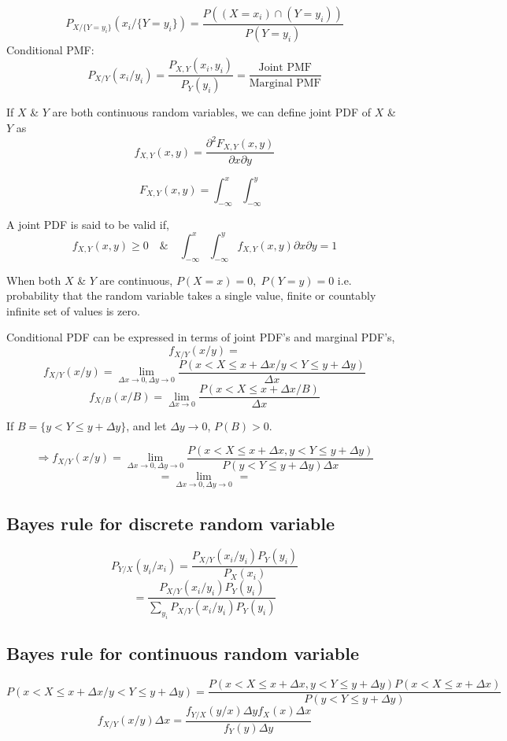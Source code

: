 \documentclass{article}
\begin{document}
$$ P_{X/\{ Y = y_i \}}(x_i/\{ Y = y_i \})= \frac{P((X= x_i) \cap (Y=y_i))}{P(Y=y_i)}$$
Conditional PMF:
$$ P_{X/Y} (x_i /y_i)= \frac{P_{X,Y}(x_i,y_i)}{P_Y(y_i)}= \frac{\text{Joint PMF}}{\text{Marginal PMF}}$$



If $X$ \& $Y$ are both continuous random variables, we can define joint PDF of $X$ \& $Y$ as
$$ f_{X,Y}(x,y)= \frac{\partial^2 F_{X,Y}(x,y)}{\partial x \partial y}$$

$$ F_{X,Y}(x,y) =\int_{-\infty}^{x} \int_{-\infty}^{y} $$

A joint PDF is said to be valid if,
$$ f_{X,Y}(x,y) \geq 0 \quad \& \quad \int_{-\infty}^{x} \int_{-\infty}^{y} f_{X,Y}(x,y)\partial x \partial y =1$$

When both $X$ \& $Y$ are continuous,
$P(X=x )=0,\; P(Y=y)=0 $ i.e. probability that the random variable takes a single value, finite or countably infinite set of values is zero.

Conditional PDF can be expressed in terms of joint PDF's and marginal PDF's,
$$ f_{X/Y}(x/y)=$$
$$ f_{X/Y}(x/y)= \lim_{\Delta x \to 0, \Delta y \to 0} \frac{P(x<X \leq x+ \Delta x / y<Y \leq y+ \Delta y)}{\Delta x}$$
$$ f_{X/B}(x/B)= \lim_{\Delta x \to 0} \frac{P(x<X \leq x+ \Delta x /B)}{\Delta x}$$

If $B= \{ y<Y \leq y+ \Delta y \}$, and let $\Delta y \to 0$, $P(B) > 0$.

$$ \Rightarrow f_{X/Y}(x/y)= \lim_{\Delta x \to 0, \Delta y \to 0} \frac{P(x<X \leq x+ \Delta x , y<Y \leq y+ \Delta y)}{P(y<Y \leq y+ \Delta y)\Delta x} $$
$$= \lim_{\Delta x \to 0, \Delta y \to 0} \frac{}{} = $$

\subsection{Bayes rule for discrete random variable}
$$ P_{Y/X}(y_i /x_i) = \frac{P_{X/Y} (x_i/y_i) P_Y (y_i)}{P_X (x_i)}$$
$$ =\frac{P_{X/Y} (x_i/y_i) P_Y (y_i)}{\sum_{y_i}P_{X/Y}(x_i/y_i) P_Y (y_i)}$$

\subsection{Bayes rule for continuous random variable}
$$ P(x < X \leq x+ \Delta x / y<Y \leq y+ \Delta y)= \frac{P(x < X \leq x+ \Delta x , y<Y \leq y+ \Delta y)P(x < X \leq x+ \Delta x)}{P(y<Y \leq y+ \Delta y)}$$
$$ f_{X/Y}(x/y) \Delta x =\frac{f_{Y/X} (y/x) \Delta y f_X (x) \Delta x}{f_Y (y) \Delta y} $$
\end{document}
